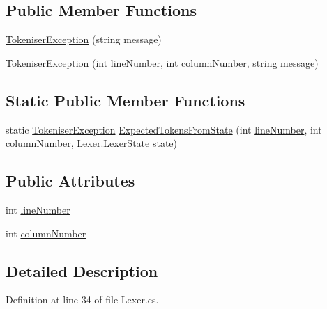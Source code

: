 \subsection*{Public Member Functions}
\begin{DoxyCompactItemize}
\item 
\hyperlink{a00174_ad00fcf742d2b0d476ce43b27a3f3b6c1}{Tokeniser\-Exception} (string message)
\item 
\hyperlink{a00174_aa8674d006a0d29081a7b87bdd8ff2f4f}{Tokeniser\-Exception} (int \hyperlink{a00174_a54b936d7b4f26f88a07a66c5fc1d1ad1}{line\-Number}, int \hyperlink{a00174_aabf2ad38f3984297c1daede9be55e3d6}{column\-Number}, string message)
\end{DoxyCompactItemize}
\subsection*{Static Public Member Functions}
\begin{DoxyCompactItemize}
\item 
static \hyperlink{a00174}{Tokeniser\-Exception} \hyperlink{a00174_af88cfa5eafdee355e1abb67e358497bd}{Expected\-Tokens\-From\-State} (int \hyperlink{a00174_a54b936d7b4f26f88a07a66c5fc1d1ad1}{line\-Number}, int \hyperlink{a00174_aabf2ad38f3984297c1daede9be55e3d6}{column\-Number}, \hyperlink{a00128}{Lexer.\-Lexer\-State} state)
\end{DoxyCompactItemize}
\subsection*{Public Attributes}
\begin{DoxyCompactItemize}
\item 
int \hyperlink{a00174_a54b936d7b4f26f88a07a66c5fc1d1ad1}{line\-Number}
\item 
int \hyperlink{a00174_aabf2ad38f3984297c1daede9be55e3d6}{column\-Number}
\end{DoxyCompactItemize}


\subsection{Detailed Description}


Definition at line 34 of file Lexer.\-cs.



